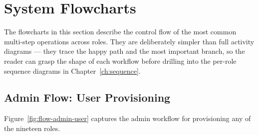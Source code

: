 \documentclass[12pt,a4paper,oneside]{report}
\begin{document}
\section{System Flowcharts}
\label{sec:flowcharts}

The flowcharts in this section describe the control flow of the most
common multi-step operations across roles. They are deliberately
simpler than full activity diagrams --- they trace the happy path and
the most important branch, so the reader can grasp the shape of each
workflow before drilling into the per-role sequence diagrams in
Chapter~\ref{ch:sequence}.

\subsection{Admin Flow: User Provisioning}
Figure~\ref{fig:flow-admin-user} captures the admin workflow for
provisioning any of the nineteen roles.
\end{document}
